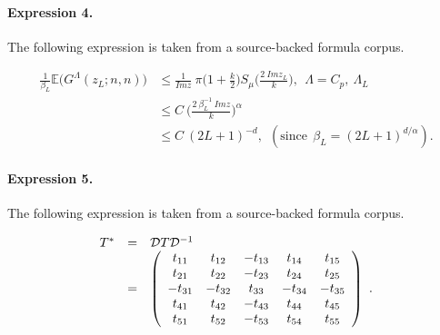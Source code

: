 \documentclass[11pt]{article}
\begin{document}
\paragraph{Expression 4.} The following expression is taken from a source-backed formula corpus.

\begin{align*} \frac{1}{\beta_L}\mathbb{E}\bigg(G^{\Lambda}(z_L;n,n)\bigg) &\leq \frac{1}{Imz}~\pi\bigg(1+\frac{k}{2}\bigg)S_\mu\bigg(\frac{2~Imz_L}{k}\bigg),~~\Lambda=C_p,~\Lambda_L\\&\leq C ~\bigg(\frac{2~\beta_L^{-1}~Imz}{k}\bigg)^{\alpha}\\&\leq C ~(2L+1)^{-d},~~(\mathrm{since} ~~ \beta_L=(2L+1)^{d/\alpha}).\end{align*}

\paragraph{Expression 5.} The following expression is taken from a source-backed formula corpus.

\begin{align*}\begin{array}{rcl}T^*&=&{\cal D}T{\cal D}^{-1}\\&=&\left(\begin{array}{ccccc} t_{11}&t_{12}&-t_{13}&t_{14}&t_{15}\\ t_{21}&t_{22}&-t_{23}&t_{24}&t_{25}\\ -t_{31}&-t_{32}&t_{33}&-t_{34}&-t_{35}\\ t_{41}&t_{42}&-t_{43}&t_{44}&t_{45}\\ t_{51}&t_{52}&-t_{53}&t_{54}&t_{55}\end{array}\right)~.\end{array}\end{align*}
\end{document}
